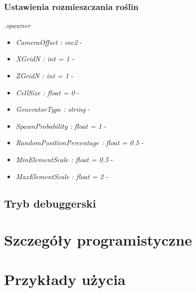 \documentclass[inz,longabstract]{iithesis}
\begin{document}
        \subsection{Ustawienia rozmieszczania roślin}
        \textit{.spawner}
        \begin{itemize}
            \item \textit{CameraOffset : vec2} -
            \item \textit{XGridN : int = 1} -
            \item \textit{ZGridN : int = 1} -
            \item \textit{CellSize : float = 0} -
            \item \textit{GeneratorType : string} -
            \item \textit{SpawnProbability : float = 1} -
            \item \textit{RandomPositionPercentage : float = 0.5} -
            \item \textit{MinElementScale : float = 0.5} -
            \item \textit{MaxElementScale : float = 2} -
        \end{itemize}
        
    \section{Tryb debuggerski}
        
\chapter{Szczegóły programistyczne}

\chapter{Przykłady użycia}





\end{document}
